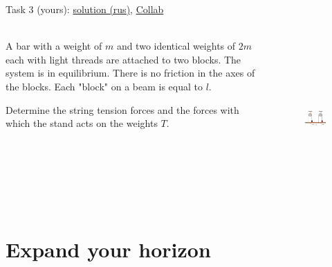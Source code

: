 \documentclass[aspectratio=169]{beamer}
\begin{document}
\begin{frame}[t]{Task 3 (yours): \href{https://easy-physic.ru/statika-podgotovka-k-olimpiadam/}{solution (rus)}, \href{https://colab.research.google.com/drive/1P1pg1yDU34CCFsNo2hBpK78VtTmlch8r?usp=sharing}{Collab}
            }
        \framesubtitle{}
        \begin{columns}[T,onlytextwidth]
            \begin{column}{0.49\textwidth}
                A bar with a weight of $m$ and two identical weights of $2m$ each with light threads are attached to two blocks. The system is in equilibrium. There is no friction in the axes of the blocks. Each "block" on a beam is equal to $l$.
                \medskip

                Determine the string tension forces and the forces with which the stand acts on the weights $T$.
            \end{column}
            \begin{column}{0.49\textwidth}
                \begin{figure}[H]
                    \centering\includegraphics[height=6cm,width=1\textwidth,keepaspectratio]{image12.png}
                    \label{fig:image12}
                \end{figure}
            \end{column}
        \end{columns}
        \end{frame}

\section*{Expand your horizon}
\end{document}
